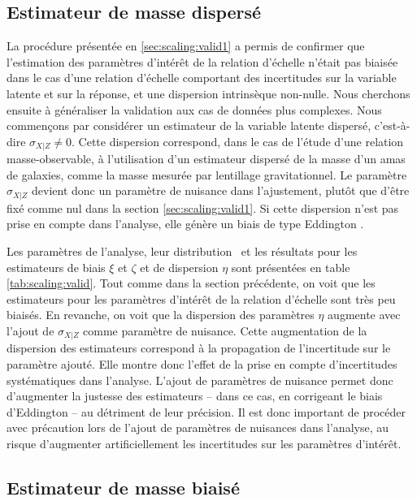 \subsection{Estimateur de masse dispersé}
\label{sec:scaling:valid2}

La procédure présentée en \ref{sec:scaling:valid1} a permis de confirmer que l'estimation des paramètres d'intérêt de la relation d'échelle n'était pas biaisée dans le cas d'une relation d'échelle comportant des incertitudes sur la variable latente et sur la réponse, et une dispersion intrinsèque non-nulle.
Nous cherchons ensuite à généraliser la validation aux cas de données plus complexes.
Nous commençons par considérer un estimateur de la variable latente dispersé, c'est-à-dire $\sigma_{X|Z} \neq 0$.
Cette dispersion correspond, dans le cas de l'étude d'une relation masse-observable, à l'utilisation d'un estimateur dispersé de la masse d'un amas de galaxies, comme la masse mesurée par lentillage gravitationnel.
Le paramètre $\sigma_{X|Z}$ devient donc un paramètre de nuisance dans l'ajustement, plutôt que d'être fixé comme nul dans la section \ref{sec:scaling:valid1}.
Si cette dispersion n'est pas prise en compte dans l'analyse, elle génère un biais de type Eddington \cite{eddington_formula_1913,eddington_correction_1940}.

Les paramètres de l'analyse, leur distribution \prior\ et les résultats pour les estimateurs de biais $\xi$ et $\zeta$ et de dispersion $\eta$ sont présentées en table \ref{tab:scaling:valid}.
Tout comme dans la section précédente, on voit que les estimateurs pour les paramètres d'intérêt de la relation d'échelle sont très peu biaisés.
En revanche, on voit que la dispersion des paramètres $\eta$ augmente avec l'ajout de $\sigma_{X|Z}$ comme paramètre de nuisance.
Cette augmentation de la dispersion des estimateurs correspond à la propagation de l'incertitude sur le paramètre ajouté.
Elle montre donc l'effet de la prise en compte d'incertitudes systématiques dans l'analyse.
L'ajout de paramètres de nuisance permet donc d'augmenter la justesse des estimateurs -- dans ce cas, en corrigeant le biais d'Eddington -- au détriment de leur précision.
Il est donc important de procéder avec précaution lors de l'ajout de paramètres de nuisances dans l'analyse, au risque d'augmenter artificiellement les incertitudes sur les paramètres d'intérêt.

\subsection{Estimateur de masse biaisé}
\label{sec:scaling:valid3}

